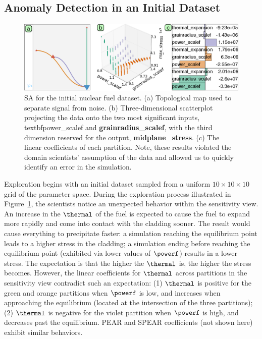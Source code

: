 \subsection{Anomaly Detection in an Initial Dataset}
\label{sec:anomaly}

\begin{figure}[htbp]
  \centering
  \includegraphics[width=1.0\linewidth]{figs/chap6/bisonError2}
  \caption{SA for the initial nuclear fuel dataset.
  (a) Topological map used to separate signal from noise.
  (b) Three-dimensional scatterplot projecting the data onto the two most significant inputs, textbf{power\_scalef} and \textbf{grainradius\_scalef}, with the third dimension reserved for the output, \textbf{midplane\_stress}.
  (c) The linear coefficients of each partition. Note, these results violated the domain scientists' assumption of the data and allowed us to quickly identify an error in the simulation.}
  \label{fig:bisonError}
\end{figure}

Exploration begins with an initial dataset sampled from a
uniform $10\times10\times10$ grid of the parameter space.
%
During the exploration process illustrated in Figure~\ref{fig:bisonError}, the scientists notice an unexpected behavior within the sensitivity view.
%
An increase in the $\thermal$ of the fuel is expected to cause the fuel to expand more rapidly and come into contact with the cladding sooner.
%
The result would cause everything to precipitate faster: a simulation reaching the equilibrium point leads to a higher stress in the cladding; a simulation ending before reaching the equilibrium point (exhibited via lower values of $\powerf$) results in a lower stress.
%
The expectation is that the higher the $\thermal$ is, the higher the stress becomes.
%
However, the linear coefficients for $\thermal$ across partitions in the sensitivity view contradict such an expectation:
(1) $\thermal$ is positive for the green and orange partitions when $\powerf$ is low, and increases when approaching the equilibrium (located at the intersection of the three partitions);
(2) $\thermal$ is negative for the violet partition when $\powerf$ is high, and decreases past the equilibrium.
PEAR and SPEAR coefficients (not shown here) exhibit similar behaviors.

